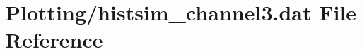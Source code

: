 \hypertarget{Plotting_2histsim__channel3_8dat}{}\section{Plotting/histsim\+\_\+channel3.dat File Reference}
\label{Plotting_2histsim__channel3_8dat}
